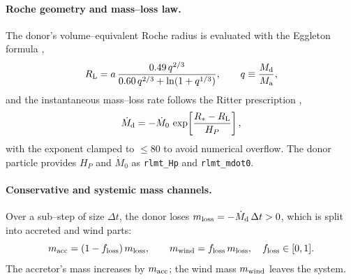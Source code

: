 \documentclass[11pt]{article}
\begin{document}
\paragraph{Roche geometry and mass–loss law.}
The donor’s volume–equivalent Roche radius is evaluated with the Eggleton
formula \citep{Eggleton1983},
\begin{equation}
R_{\rm L} = a\,\frac{0.49\,q^{2/3}}{0.60\,q^{2/3} + \ln(1+q^{1/3})},
\qquad q \equiv \frac{M_{\rm d}}{M_{\rm a}},
\end{equation}
and the instantaneous mass–loss rate follows the Ritter prescription
\citep{Ritter1988},
\begin{equation}
\dot M_{\rm d} = -\dot M_0\,
\exp\!\left[\frac{R_\ast - R_{\rm L}}{H_P}\right],
\end{equation}
with the exponent clamped to $\le 80$ to avoid numerical overflow. The donor
particle provides $H_P$ and $\dot M_0$ as \texttt{rlmt\_Hp} and
\texttt{rlmt\_mdot0}.

\paragraph{Conservative and systemic mass channels.}
Over a sub–step of size $\Delta t$, the donor loses $m_{\rm loss}=-\dot M_{\rm d}\,\Delta t>0$,
which is split into accreted and wind parts:
\[
m_{\rm acc} = (1-f_{\rm loss})\,m_{\rm loss},\qquad
m_{\rm wind} = f_{\rm loss}\,m_{\rm loss},\quad f_{\rm loss}\in[0,1].
\]
The accretor’s mass increases by $m_{\rm acc}$; the wind mass $m_{\rm wind}$
leaves the system.
\end{document}
